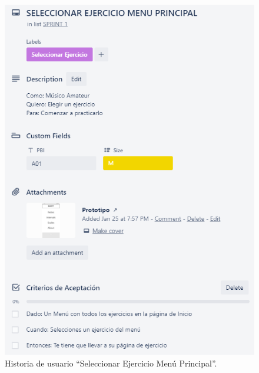 \documentclass[12pt,twoside,titlepage]{report}
\begin{document}
{\begin{figure}[H]
    \centering
    \includegraphics[scale=1.3]{Scrum/User Stories/MenuMain}
    \caption{Historia de usuario ``Seleccionar Ejercicio Menú Principal''.}
    \label{fig:MenuMain}
\end{figure}

}
\end{document}
